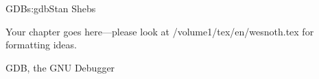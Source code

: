 \begin{aosachapter}{GDB}{s:gdb}{Stan Shebs}

Your chapter goes here---please look at /volume1/tex/en/wesnoth.tex for 
formatting ideas.

GDB, the GNU Debugger

\end{aosachapter}
